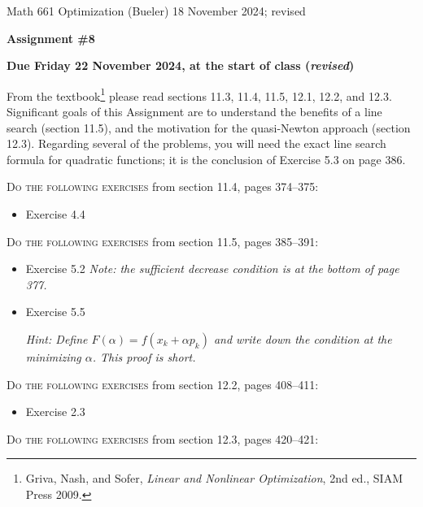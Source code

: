 \documentclass[12pt]{amsart}
\begin{document}
\scriptsize \noindent Math 661 Optimization (Bueler) \hfill {\color{BrickRed} 18 November 2024; revised}
\normalsize

\medskip\bigskip

\Large\centerline{\textbf{Assignment \#8}}
\large
\bigskip

\centerline{{\color{BrickRed} \textbf{Due Friday 22 November 2024, at the start of class (\emph{revised})}}}
\bigskip
\normalsize

\thispagestyle{empty}

\bigskip
\noindent From the textbook\footnote{Griva, Nash, and Sofer, \emph{Linear and Nonlinear Optimization}, 2nd ed., SIAM Press 2009.} please read sections 11.3, 11.4, 11.5, 12.1, 12.2, and 12.3.  Significant goals of this Assignment are to understand the benefits of a line search (section 11.5), and the motivation for the quasi-Newton approach (section 12.3).  Regarding several of the problems, you will need the exact line search formula for quadratic functions; it is the conclusion of Exercise 5.3 on page 386.

\bigskip
\noindent \textsc{Do the following exercises} from section 11.4, pages 374--375:

\begin{itemize}
\item Exercise 4.4
\end{itemize}

\bigskip
\noindent \textsc{Do the following exercises} from section 11.5, pages 385--391:

\begin{itemize}
\item Exercise 5.2 \quad \emph{Note: the sufficient decrease condition is at the bottom of page 377.}
\item Exercise 5.5 \quad \begin{minipage}[t]{115mm}  \emph{Hint: Define $F(\alpha)=f(x_k+\alpha p_k)$ and write down the condition at the minimizing $\alpha$.  This proof is short.}
\end{minipage}
\end{itemize}


\bigskip
\noindent \textsc{Do the following exercises} from section 12.2, pages 408--411:

\begin{itemize}
\item Exercise 2.3
\end{itemize}


\bigskip
\noindent \textsc{Do the following exercises} from section 12.3, pages 420--421:
\end{document}
